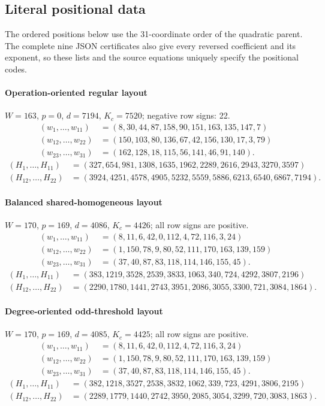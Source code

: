 \subsection{Literal positional data}
The ordered positions below use the 31-coordinate order of the quadratic
parent. The complete nine JSON certificates also give every reversed
coefficient and its exponent, so these lists and the source equations
uniquely specify the positional codes.
\paragraph{Operation-oriented regular layout}
$W=163$, $p=0$, $d=7194$, $K_c=7520$; negative row signs: 22.
\[\begin{aligned}
(w_{1},\ldots,w_{11})&=(8,30,44,87,158,90,151,163,135,147,7)\\
(w_{12},\ldots,w_{22})&=(150,103,80,136,67,42,156,130,17,3,79)\\
(w_{23},\ldots,w_{31})&=(162,128,18,115,56,141,46,91,140).
\end{aligned}\]
\[\begin{aligned}
(H_{1},\ldots,H_{11})&=(327,654,981,1308,1635,1962,2289,2616,2943,3270,3597)\\
(H_{12},\ldots,H_{22})&=(3924,4251,4578,4905,5232,5559,5886,6213,6540,6867,7194).
\end{aligned}\]
\paragraph{Balanced shared-homogeneous layout}
$W=170$, $p=169$, $d=4086$, $K_c=4426$; all row signs are positive.
\[\begin{aligned}
(w_{1},\ldots,w_{11})&=(8,11,6,42,0,112,4,72,116,3,24)\\
(w_{12},\ldots,w_{22})&=(1,150,78,9,80,52,111,170,163,139,159)\\
(w_{23},\ldots,w_{31})&=(37,40,87,83,118,114,146,155,45).
\end{aligned}\]
\[\begin{aligned}
(H_{1},\ldots,H_{11})&=(383,1219,3528,2539,3833,1063,340,724,4292,3807,2196)\\
(H_{12},\ldots,H_{22})&=(2290,1780,1441,2743,3951,2086,3055,3300,721,3084,1864).
\end{aligned}\]
\paragraph{Degree-oriented odd-threshold layout}
$W=170$, $p=169$, $d=4085$, $K_c=4425$; all row signs are positive.
\[\begin{aligned}
(w_{1},\ldots,w_{11})&=(8,11,6,42,0,112,4,72,116,3,24)\\
(w_{12},\ldots,w_{22})&=(1,150,78,9,80,52,111,170,163,139,159)\\
(w_{23},\ldots,w_{31})&=(37,40,87,83,118,114,146,155,45).
\end{aligned}\]
\[\begin{aligned}
(H_{1},\ldots,H_{11})&=(382,1218,3527,2538,3832,1062,339,723,4291,3806,2195)\\
(H_{12},\ldots,H_{22})&=(2289,1779,1440,2742,3950,2085,3054,3299,720,3083,1863).
\end{aligned}\]
